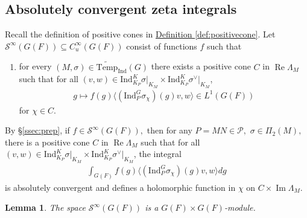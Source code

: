 \documentclass[10pt]{amsart}
\newtheorem{lemma}[theorem]{Lemma}
\theoremstyle{definition}
\numberwithin{equation}{section}
\numberwithin{equation}{subsection}
\newcommand{\Ind}{\mathrm{Ind}}
\renewcommand{\Im}{\mathop{\mathrm{Im}}}
\renewcommand{\Re}{\mathop{\mathrm{Re}}}
\begin{document}
\subsection{Absolutely convergent zeta integrals}\label{subsec:L1zeta}
Recall the definition of positive cones in \hyperref[def:positivecone]{Definition \ref{def:positivecone}}. Let $\mathcal{S}^{\infty}(G(F))\subseteq C^\infty_{u}(G(F))$ consist of functions $f$ such that
\begin{enumerate}[label=(S\text{\arabic*}), ref=S\text{\arabic*}]
    \item\label{S1} for every $(M,\sigma)\in\widetilde{\mathrm{Temp}}_\Ind(G)$ there exists a positive cone $C$ in $\Re\Lambda_M$  such that for all $(v,w)\in\Ind_{K_P }^K\sigma\vert_{K_M }\times \Ind_{K_P }^K\sigma^\vee\vert_{K_M }$, 
    \begin{align*}
        g\mapsto f(g)\langle(\Ind_P^G\sigma_\chi)(g)v,w\rangle \in L^1(G(F))
    \end{align*}
    for $\chi\in C$. 
\end{enumerate}
By \S \ref{ssec:prep}, if $f\in \mathcal{S}^\infty(G(F)),$ then for any $P=MN\in \mathcal{P},$  $\sigma\in \Pi_2(M),$ there is a positive cone $C$ in $\Re \Lambda_M$ such that for all $(v,w)\in\Ind_{K_P }^K\sigma\vert_{K_M }\times \Ind_{K_P }^K\sigma^\vee\vert_{K_M }$, the integral
\begin{align*}
    \int_{G(F)} f(g)\langle(\Ind_P^G\sigma_\chi)(g)v,w\rangle dg
\end{align*}
is absolutely convergent and defines a holomorphic function in $\chi$ on $C\times \Im \Lambda_M$.


\begin{lemma}\label{Sinftymodule}
    The space $\mathcal{S}^\infty(G(F))$ is a $G(F)\times G(F)$-module.  
\end{lemma}
\end{document}
